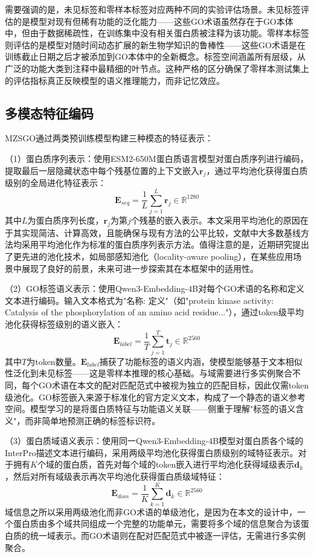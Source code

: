 需要强调的是，未见标签和零样本标签对应两种不同的实验评估场景。未见标签评估的是模型对现有但稀有功能的泛化能力——这些GO术语虽然存在于GO本体中，但由于数据稀疏性，在训练集中没有相关蛋白质被注释为该功能。零样本标签则评估的是模型对随时间动态扩展的新生物学知识的鲁棒性——这些GO术语是在训练截止日期之后才被添加到GO本体中的全新概念。标签空间涵盖所有层级，从广泛的功能大类到注释中最精细的叶节点。这种严格的区分确保了零样本测试集上的评估指标真正反映模型的语义推理能力，而非记忆效应。

\subsection{多模态特征编码}

MZSGO通过两类预训练模型构建三种模态的特征表示：

（1）蛋白质序列表示：使用ESM2-650M\cite{lin2023evolutionary}蛋白质语言模型对蛋白质序列进行编码，提取最后一层隐藏状态中每个残基位置的上下文嵌入$\mathbf{r}_j$，通过平均池化获得蛋白质级别的全局进化特征表示：
\begin{equation}
    \mathbf{E}_{seq} = \frac{1}{L} \sum_{j=1}^{L} \mathbf{r}_j \in \mathbb{R}^{1280}
\end{equation}
其中$L$为蛋白质序列长度，$\mathbf{r}_j$为第$j$个残基的嵌入表示。本文采用平均池化的原因在于其实现简洁、计算高效，且能确保与现有方法的公平比较，文献中大多数基线方法均采用平均池化作为标准的蛋白质序列表示方法。值得注意的是，近期研究提出了更先进的池化技术，如局部感知池化（locality-aware pooling）\cite{hoang2025locality}，在某些应用场景中展现了良好的前景，未来可进一步探索其在本框架中的适用性。

（2）GO标签语义表示：使用Qwen3-Embedding-4B\cite{zhang2025qwen3}对每个GO术语的名称和定义文本进行编码。输入文本格式为"名称: 定义"（如"protein kinase activity: Catalysis of the phosphorylation of an amino acid residue..."），通过token级平均池化获得标签级别的语义嵌入：
\begin{equation}
    \mathbf{E}_{label} = \frac{1}{T} \sum_{j=1}^{T} \mathbf{t}_j \in \mathbb{R}^{2560}
\end{equation}
其中$T$为token数量。$\mathbf{E}_{label}$捕获了功能标签的语义内涵，使模型能够基于文本相似性泛化到未见标签——这是零样本推理的核心基础。与域需要进行多实例聚合不同，每个GO术语在本文的配对匹配范式中被视为独立的匹配目标，因此仅需token级池化。GO标签嵌入来源于标准化的官方定义文本，构成了一个静态的语义参考空间。模型学习的是将蛋白质特征与功能语义关联——侧重于理解"标签的语义含义"，而非简单地预测正确的标签标识符。

（3）蛋白质域语义表示：使用同一Qwen3-Embedding-4B模型对蛋白质各个域的InterPro\cite{blum2025interpro}描述文本进行编码，采用两级平均池化获得蛋白质级别的域特征表示。对于拥有$K$个域的蛋白质，首先对每个域的token嵌入进行平均池化获得域级表示$\mathbf{d}_k$，然后对所有域级表示再次平均池化获得蛋白质级域特征：
\begin{equation}
    \mathbf{E}_{dom} = \frac{1}{K} \sum_{k=1}^{K} \mathbf{d}_k \in \mathbb{R}^{2560}
\end{equation}
域信息之所以采用两级池化而非GO术语的单级池化，是因为在本文的设计中，一个蛋白质由多个域共同组成一个完整的功能单元，需要将多个域的信息聚合为该蛋白质的统一域表示。而GO术语则在配对匹配范式中被逐一评估，无需进行多实例聚合。

